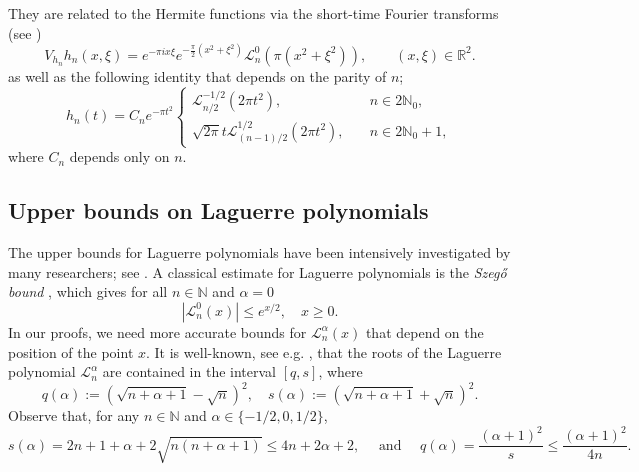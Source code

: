 \documentclass[11pt]{amsart}
\numberwithin{equation}{section}
\newcommand{\R}{{\mathbb R}}
\newcommand{\N}{{\mathbb N}}
\begin{document}
They are related to the Hermite functions via the short-time Fourier transforms (see \cite{Fol89})
\begin{equation}\label{eq:STFT_hermite_laguerre}
    V_{h_n}h_n(x,\xi)
    =
    e^{-\pi i x\xi}
    e^{-\frac{\pi}{2}(x^2+\xi^2)}
    \mathcal{L}_n^0\left(\pi(x^2+\xi^2)\right),
    \qquad (x,\xi)\in\R^2.
\end{equation}
as well as the following identity \cite[eq.~22.5.38, eq.~22.5.39]{AbramowitzStegun1964} that depends on the parity of $n$;
\begin{equation}\label{eq:h_n-L_n}
    h_n(t) = C_n e^{-\pi t^2} 
    \begin{cases}
        \mathcal{L}_{n/2}^{-1/2}(2\pi t^2), &\quad n\in 2\N_0,\\
        \sqrt{2\pi} t \mathcal{L}_{(n-1)/2}^{1/2}(2\pi t^2), &\quad  n\in2\N_0+1,
    \end{cases}
\end{equation}
where $C_n$ depends only on $n$.


\subsection{Upper bounds on Laguerre polynomials}\label{sec:upper_bounds_for_laguerre}

The upper bounds for Laguerre polynomials have been intensively investigated by many researchers; see \cite{MR2168916,MR1662719,MR1424132,Sze39}. A classical estimate for Laguerre polynomials is the \textit{Szeg\H{o} bound} \cite[eq.~(7.21.3)]{Sze39}, which gives for all $n \in \N$ and $\alpha=0$
\begin{equation}\label{eq:Szego}
    |\mathcal{L}^0_n(x)| \leq e^{x/2}, \quad x \geq 0.
\end{equation}
In our proofs, we need more accurate bounds for $\mathcal{L}_n^{\alpha}(x)$ that depend on the position of the point $x$. It is well-known, see e.g. \cite{MR1036513}, that the roots of the Laguerre polynomial $\mathcal{L}^{\alpha}_n$ are contained in the interval $[q, s]$, where 
\begin{equation}
    q(\alpha) := \left(\sqrt{n + \alpha + 1} - \sqrt{n}\right)^2, \quad s(\alpha) := \left(\sqrt{n + \alpha + 1} + \sqrt{n}\right)^2.
\end{equation}
Observe that, for any $n \in \N$ and $\alpha\in\{-1/2,0,1/2\}$,
\begin{equation}
    s(\alpha) = 2n+1+\alpha+2\sqrt{n(n+\alpha+1)}\leq 4n+2\alpha+2, 
    \quad \text{ and } \quad
    q(\alpha)=\frac{(\alpha+1)^2}{s} \leq \frac{(\alpha+1)^2}{4n}.
\end{equation}
\end{document}
